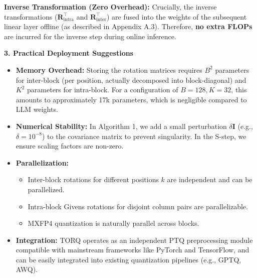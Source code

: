 \textbf{Inverse Transformation (Zero Overhead):}
Crucially, the inverse transformations ($\mathbf{R}_{\text{intra}}^\top$ and $\mathbf{R}_{\text{inter}}^\top$) are fused into the weights of the subsequent linear layer offline (as described in Appendix A.3). Therefore, \textbf{no extra FLOPs} are incurred for the inverse step during online inference.

\textbf{3. Practical Deployment Suggestions}

\begin{itemize}
    \item \textbf{Memory Overhead:} Storing the rotation matrices requires $B^2$ parameters for inter-block (per position, actually decomposed into block-diagonal) and $K^2$ parameters for intra-block. For a configuration of $B=128, K=32$, this amounts to approximately 17k parameters, which is negligible compared to LLM weights.
    \item \textbf{Numerical Stability:} In Algorithm 1, we add a small perturbation $\delta \mathbf{I}$ (e.g., $\delta=10^{-8}$) to the covariance matrix to prevent singularity. In the S-step, we ensure scaling factors are non-zero.
    \item \textbf{Parallelization:}
    \begin{itemize}
        \item Inter-block rotations for different positions $k$ are independent and can be parallelized.
        \item Intra-block Givens rotations for disjoint column pairs are parallelizable.
        \item MXFP4 quantization is naturally parallel across blocks.
    \end{itemize}
    \item \textbf{Integration:} TORQ operates as an independent PTQ preprocessing module compatible with mainstream frameworks like PyTorch and TensorFlow, and can be easily integrated into existing quantization pipelines (e.g., GPTQ, AWQ).
\end{itemize}
